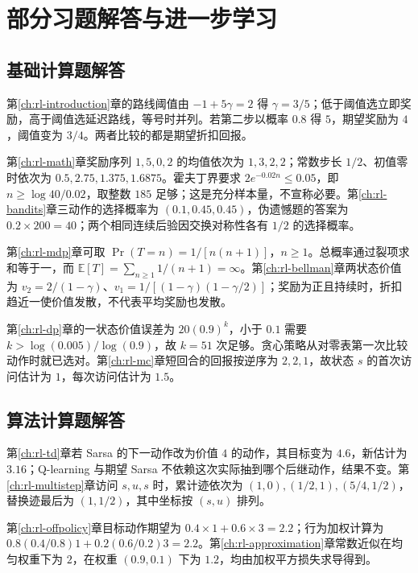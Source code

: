 \documentclass[UTF8,12pt,a4paper,fontset=fandol]{ctexbook}
\begin{document}
\chapter{部分习题解答与进一步学习}
\label{app:rl-exercises}

\section{基础计算题解答}

第\ref{ch:rl-introduction}章的路线阈值由 $-1+5\gamma=2$ 得 $\gamma=3/5$；低于阈值选立即奖励，高于阈值选延迟路线，等号时并列。若第二步以概率 $0.8$ 得 $5$，期望奖励为 $4$，阈值变为 $3/4$。两者比较的都是期望折扣回报。

第\ref{ch:rl-math}章奖励序列 $1,5,0,2$ 的均值依次为 $1,3,2,2$；常数步长 $1/2$、初值零时依次为 $0.5,2.75,1.375,1.6875$。霍夫丁界要求 $2e^{-0.02n}\leq0.05$，即 $n\geq\log40/0.02$，取整数 $185$ 足够；这是充分样本量，不宣称必要。第\ref{ch:rl-bandits}章三动作的选择概率为 $(0.1,0.45,0.45)$，伪遗憾题的答案为 $0.2\times200=40$；两个相同连续后验因交换对称性各有 $1/2$ 的选择概率。

第\ref{ch:rl-mdp}章可取 $\Pr(T=n)=1/[n(n+1)]$，$n\geq1$。总概率通过裂项求和等于一，而 $\mathbb E[T]=\sum_{n\geq1}1/(n+1)=\infty$。第\ref{ch:rl-bellman}章两状态价值为 $v_2=2/(1-\gamma)$、$v_1=1/[(1-\gamma)(1-\gamma/2)]$；奖励为正且持续时，折扣趋近一使价值发散，不代表平均奖励也发散。

第\ref{ch:rl-dp}章的一状态价值误差为 $20(0.9)^k$，小于 $0.1$ 需要 $k>\log(0.005)/\log(0.9)$，故 $k=51$ 次足够。贪心策略从对零表第一次比较动作时就已选对。第\ref{ch:rl-mc}章短回合的回报按逆序为 $2,2,1$，故状态 $s$ 的首次访问估计为 $1$，每次访问估计为 $1.5$。

\section{算法计算题解答}

第\ref{ch:rl-td}章若 Sarsa 的下一动作改为价值 $4$ 的动作，其目标变为 $4.6$，新估计为 $3.16$；Q-learning 与期望 Sarsa 不依赖这次实际抽到哪个后继动作，结果不变。第\ref{ch:rl-multistep}章访问 $s,u,s$ 时，累计迹依次为 $(1,0),(1/2,1),(5/4,1/2)$，替换迹最后为 $(1,1/2)$，其中坐标按 $(s,u)$ 排列。

第\ref{ch:rl-offpolicy}章目标动作期望为 $0.4\times1+0.6\times3=2.2$；行为加权计算为 $0.8(0.4/0.8)1+0.2(0.6/0.2)3=2.2$。第\ref{ch:rl-approximation}章常数近似在均匀权重下为 $2$，在权重 $(0.9,0.1)$ 下为 $1.2$，均由加权平方损失求导得到。
\end{document}
